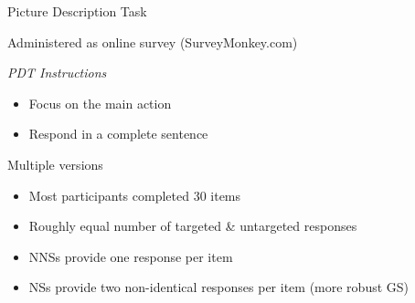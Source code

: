 \documentclass[final,14pt,t]{beamer}
\begin{document}
\begin{frame}{}
\begin{columns}[t]
\begin{column}{.33\linewidth}
\begin{minipage}[t][\textheight]{\linewidth}
\begin{block}{Picture Description Task}
\begin{center}
\begin{minipage}{.85\textwidth}
Administered as online survey (SurveyMonkey.com)

\vspace{.6em}
  \textit{PDT Instructions}
    \begin{itemize}
    \item Focus on the main action
    \item Respond in a complete sentence
    \end{itemize}

\vspace{.6em}
Multiple versions
	\begin{itemize}
		\item Most participants completed 30 items
		\item Roughly equal number of targeted \& untargeted responses %
		\item NNSs provide one response per item
		\item NSs provide two non-identical responses per item (more robust GS)
	\end{itemize}


\end{minipage}
\end{center}
\end{block}
\end{minipage}
\end{column}
\end{columns}
\end{frame}
\end{document}
